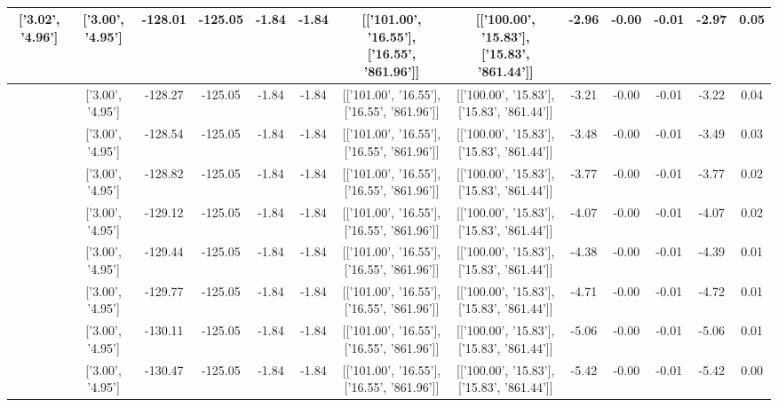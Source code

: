 \begin{table}[htbp]
\begin{adjustbox}{angle=90}
\begin{tabular}{|c|c|c|c|c|c|c|c|c|c|c|c|c|}
 ['3.02', '4.96'] & ['3.00', '4.95'] & -128.01 & -125.05 & -1.84 & -1.84 & [['101.00', '16.55'], ['16.55', '861.96']] & [['100.00', '15.83'], ['15.83', '861.44']] & -2.96 & -0.00 & -0.01 & -2.97 & 0.05\\ \hline
 ['3.02', '4.96'] & ['3.00', '4.95'] & -128.27 & -125.05 & -1.84 & -1.84 & [['101.00', '16.55'], ['16.55', '861.96']] & [['100.00', '15.83'], ['15.83', '861.44']] & -3.21 & -0.00 & -0.01 & -3.22 & 0.04\\ \hline
 ['3.02', '4.96'] & ['3.00', '4.95'] & -128.54 & -125.05 & -1.84 & -1.84 & [['101.00', '16.55'], ['16.55', '861.96']] & [['100.00', '15.83'], ['15.83', '861.44']] & -3.48 & -0.00 & -0.01 & -3.49 & 0.03\\ \hline
 ['3.02', '4.96'] & ['3.00', '4.95'] & -128.82 & -125.05 & -1.84 & -1.84 & [['101.00', '16.55'], ['16.55', '861.96']] & [['100.00', '15.83'], ['15.83', '861.44']] & -3.77 & -0.00 & -0.01 & -3.77 & 0.02\\ \hline
 ['3.02', '4.96'] & ['3.00', '4.95'] & -129.12 & -125.05 & -1.84 & -1.84 & [['101.00', '16.55'], ['16.55', '861.96']] & [['100.00', '15.83'], ['15.83', '861.44']] & -4.07 & -0.00 & -0.01 & -4.07 & 0.02\\ \hline
 ['3.03', '4.96'] & ['3.00', '4.95'] & -129.44 & -125.05 & -1.84 & -1.84 & [['101.00', '16.55'], ['16.55', '861.96']] & [['100.00', '15.83'], ['15.83', '861.44']] & -4.38 & -0.00 & -0.01 & -4.39 & 0.01\\ \hline
 ['3.03', '4.96'] & ['3.00', '4.95'] & -129.77 & -125.05 & -1.84 & -1.84 & [['101.00', '16.55'], ['16.55', '861.96']] & [['100.00', '15.83'], ['15.83', '861.44']] & -4.71 & -0.00 & -0.01 & -4.72 & 0.01\\ \hline
 ['3.03', '4.96'] & ['3.00', '4.95'] & -130.11 & -125.05 & -1.84 & -1.84 & [['101.00', '16.55'], ['16.55', '861.96']] & [['100.00', '15.83'], ['15.83', '861.44']] & -5.06 & -0.00 & -0.01 & -5.06 & 0.01\\ \hline
 ['3.03', '4.96'] & ['3.00', '4.95'] & -130.47 & -125.05 & -1.84 & -1.84 & [['101.00', '16.55'], ['16.55', '861.96']] & [['100.00', '15.83'], ['15.83', '861.44']] & -5.42 & -0.00 & -0.01 & -5.42 & 0.00\\ \hline
            \end{tabular}
        \end{adjustbox}
        \caption{}
        \label{}
    \end{table}
    